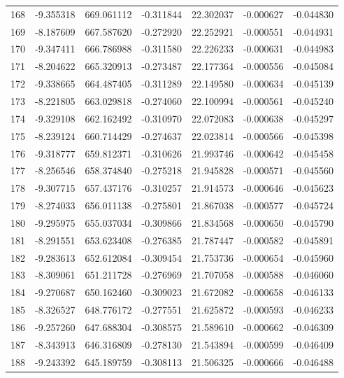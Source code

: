 \begin{tabular}{rrrrrrr}
 168 &  -9.355318 &  669.061112 & -0.311844 &  22.302037 &  -0.000627 & -0.044830 \\
 169 &  -8.187609 &  667.587620 & -0.272920 &  22.252921 &  -0.000551 & -0.044931 \\
 170 &  -9.347411 &  666.786988 & -0.311580 &  22.226233 &  -0.000631 & -0.044983 \\
 171 &  -8.204622 &  665.320913 & -0.273487 &  22.177364 &  -0.000556 & -0.045084 \\
 172 &  -9.338665 &  664.487405 & -0.311289 &  22.149580 &  -0.000634 & -0.045139 \\
 173 &  -8.221805 &  663.029818 & -0.274060 &  22.100994 &  -0.000561 & -0.045240 \\
 174 &  -9.329108 &  662.162492 & -0.310970 &  22.072083 &  -0.000638 & -0.045297 \\
 175 &  -8.239124 &  660.714429 & -0.274637 &  22.023814 &  -0.000566 & -0.045398 \\
 176 &  -9.318777 &  659.812371 & -0.310626 &  21.993746 &  -0.000642 & -0.045458 \\
 177 &  -8.256546 &  658.374840 & -0.275218 &  21.945828 &  -0.000571 & -0.045560 \\
 178 &  -9.307715 &  657.437176 & -0.310257 &  21.914573 &  -0.000646 & -0.045623 \\
 179 &  -8.274033 &  656.011138 & -0.275801 &  21.867038 &  -0.000577 & -0.045724 \\
 180 &  -9.295975 &  655.037034 & -0.309866 &  21.834568 &  -0.000650 & -0.045790 \\
 181 &  -8.291551 &  653.623408 & -0.276385 &  21.787447 &  -0.000582 & -0.045891 \\
 182 &  -9.283613 &  652.612084 & -0.309454 &  21.753736 &  -0.000654 & -0.045960 \\
 183 &  -8.309061 &  651.211728 & -0.276969 &  21.707058 &  -0.000588 & -0.046060 \\
 184 &  -9.270687 &  650.162460 & -0.309023 &  21.672082 &  -0.000658 & -0.046133 \\
 185 &  -8.326527 &  648.776172 & -0.277551 &  21.625872 &  -0.000593 & -0.046233 \\
 186 &  -9.257260 &  647.688304 & -0.308575 &  21.589610 &  -0.000662 & -0.046309 \\
 187 &  -8.343913 &  646.316809 & -0.278130 &  21.543894 &  -0.000599 & -0.046409 \\
 188 &  -9.243392 &  645.189759 & -0.308113 &  21.506325 &  -0.000666 & -0.046488 \\

\end{tabular}
